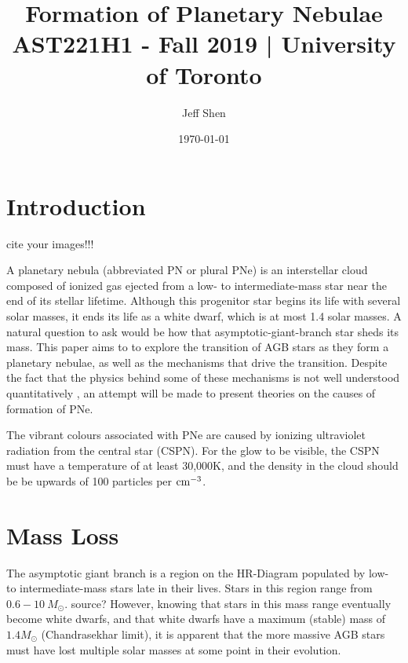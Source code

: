 \documentclass[a4paper,11pt,twocolumn]{article}
\begin{document}
\title{Formation of Planetary Nebulae\\
    \large AST221H1 - Fall 2019 | University of Toronto}
\author{Jeff Shen}
\date{\today}
\maketitle

\section{Introduction}

{\huge cite your images!!!}


A planetary nebula (abbreviated PN or plural PNe) is an interstellar cloud composed of ionized gas ejected from a low- to intermediate-mass star near the end of its stellar lifetime. Although this progenitor star begins its life with several solar masses, it ends its life as a white dwarf, which is at most 1.4 solar masses. A natural question to ask would be how that asymptotic-giant-branch star sheds its mass. This paper aims to to explore the transition of AGB stars as they form a planetary nebulae, as well as the mechanisms that drive the transition. Despite the fact that the physics behind some of these mechanisms is not well understood quantitatively \cite{schoenberner}, an attempt will be made to present theories on the causes of formation of PNe.


The vibrant colours associated with PNe are caused by ionizing ultraviolet radiation from the central star (CSPN). For the glow to be visible, the CSPN must have a temperature of at least 30,000K, and the density in the cloud should be be upwards of 100 particles per ${\rm cm^{-3}}$.






\section{Mass Loss}

The asymptotic giant branch is a region on the HR-Diagram populated by low- to intermediate-mass stars late in their lives. Stars in this region range from $0.6-10~M_\odot$. {\huge source?} However, knowing that stars in this mass range eventually become white dwarfs, and that white dwarfs have a maximum (stable) mass of $1.4 M_\odot$ (Chandrasekhar limit), it is apparent that the more massive AGB stars must have lost multiple solar masses at some point in their evolution. 
\end{document}
